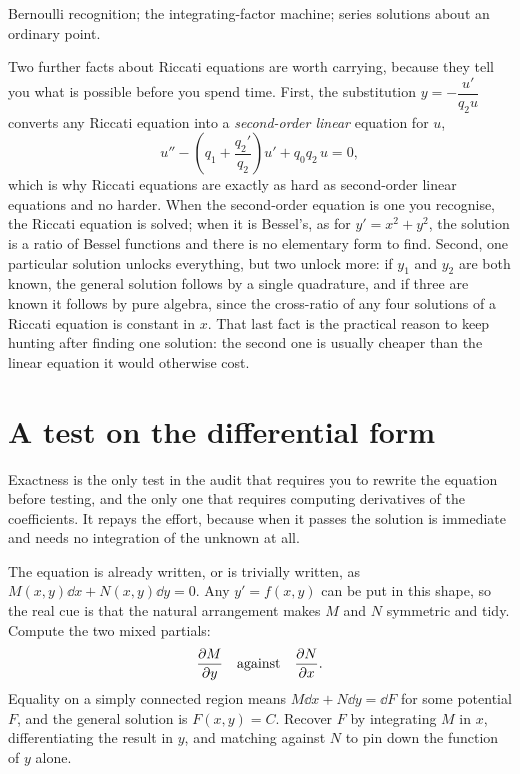 \begin{seealsob}Bernoulli recognition; the integrating-factor machine; series solutions about an ordinary point.\end{seealsob}

Two further facts about Riccati equations are worth carrying, because they tell you what is possible before you spend time. First, the substitution $y=-\dfrac{u'}{q_2u}$ converts any Riccati equation into a \emph{second-order linear} equation for $u$,
\[u''-\left(q_1+\frac{q_2'}{q_2}\right)u'+q_0q_2\,u=0,\]
which is why Riccati equations are exactly as hard as second-order linear equations and no harder. When the second-order equation is one you recognise, the Riccati equation is solved; when it is Bessel's, as for $y'=x^{2}+y^{2}$, the solution is a ratio of Bessel functions and there is no elementary form to find. Second, one particular solution unlocks everything, but two unlock more: if $y_1$ and $y_2$ are both known, the general solution follows by a single quadrature, and if three are known it follows by pure algebra, since the cross-ratio of any four solutions of a Riccati equation is constant in $x$. That last fact is the practical reason to keep hunting after finding one solution: the second one is usually cheaper than the linear equation it would otherwise cost.

\section{A test on the differential form}

Exactness is the only test in the audit that requires you to rewrite the equation before testing, and the only one that requires computing derivatives of the coefficients. It repays the effort, because when it passes the solution is immediate and needs no integration of the unknown at all.

\cue The equation is already written, or is trivially written, as $M(x,y)\dd x+N(x,y)\dd y=0$. Any $y'=f(x,y)$ can be put in this shape, so the real cue is that the natural arrangement makes $M$ and $N$ symmetric and tidy.
\method Compute the two mixed partials:
\[\frac{\partial M}{\partial y}\quad\text{against}\quad\frac{\partial N}{\partial x}.\]
Equality on a simply connected region means $M\dd x+N\dd y=\dd F$ for some potential $F$, and the general solution is $F(x,y)=C$. Recover $F$ by integrating $M$ in $x$, differentiating the result in $y$, and matching against $N$ to pin down the function of $y$ alone.

